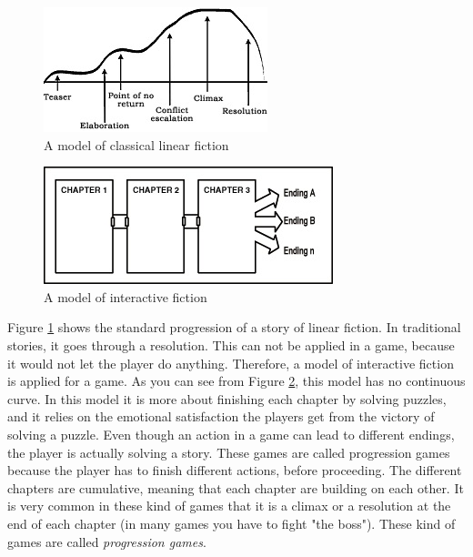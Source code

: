 \begin{figure}
\begin{center}
\includegraphics[scale=1.0]{linearFiction}
\caption[Classical Linear Fiction]{A model of classical linear fiction \cite{understandingvg}}
\label{fig:linearfiction}
\end{center}
\end{figure} 
\begin{figure}
\begin{center}
\includegraphics[scale=1.0]{interactiveFiction}
\caption[Interactive Fiction]{A model of interactive fiction \cite{understandingvg}}
\label{fig:interactivefiction}
\end{center}
\end{figure} 

Figure \ref{fig:linearfiction} shows the standard progression of a story of linear fiction. In traditional stories, it goes through a resolution. This can not be applied in a game, because it would not let the player do anything. Therefore, a model of interactive fiction is applied for a game. As you can see from Figure \ref{fig:interactivefiction}, this model has no continuous curve. In this model it is more about finishing each chapter by solving puzzles, and it relies on the emotional satisfaction the players get from the victory of solving a puzzle. Even though an action in a game can lead to different endings, the player is actually solving a story. These games are called progression games because the player has to finish different actions, before proceeding. The different chapters are cumulative, meaning that each chapter are building on each other. It is very common in these kind of games that it is a climax or a resolution at the end of each chapter (in many games you have to fight "the boss"). These kind of games are called \emph{progression games}. 

